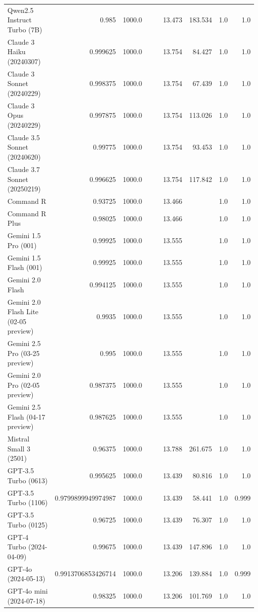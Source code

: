 \begin{table}[htp]
{\begin{tabular}{lrrrrrrrr}
Qwen2.5 Instruct Turbo (7B) & 0.985 & 1000.0 &  &  & 13.473 & 183.534 & 1.0 & 1.0 \\
Claude 3 Haiku (20240307) & 0.999625 & 1000.0 &  &  & 13.754 & 84.427 & 1.0 & 1.0 \\
Claude 3 Sonnet (20240229) & 0.998375 & 1000.0 &  &  & 13.754 & 67.439 & 1.0 & 1.0 \\
Claude 3 Opus (20240229) & 0.997875 & 1000.0 &  &  & 13.754 & 113.026 & 1.0 & 1.0 \\
Claude 3.5 Sonnet (20240620) & 0.99775 & 1000.0 &  &  & 13.754 & 93.453 & 1.0 & 1.0 \\
Claude 3.7 Sonnet (20250219) & 0.996625 & 1000.0 &  &  & 13.754 & 117.842 & 1.0 & 1.0 \\
Command R & 0.93725 & 1000.0 &  &  & 13.466 &  & 1.0 & 1.0 \\
Command R Plus & 0.98025 & 1000.0 &  &  & 13.466 &  & 1.0 & 1.0 \\
Gemini 1.5 Pro (001) & 0.99925 & 1000.0 &  &  & 13.555 &  & 1.0 & 1.0 \\
Gemini 1.5 Flash (001) & 0.99925 & 1000.0 &  &  & 13.555 &  & 1.0 & 1.0 \\
Gemini 2.0 Flash & 0.994125 & 1000.0 &  &  & 13.555 &  & 1.0 & 1.0 \\
Gemini 2.0 Flash Lite (02-05 preview) & 0.9935 & 1000.0 &  &  & 13.555 &  & 1.0 & 1.0 \\
Gemini 2.5 Pro (03-25 preview) & 0.995 & 1000.0 &  &  & 13.555 &  & 1.0 & 1.0 \\
Gemini 2.0 Pro (02-05 preview) & 0.987375 & 1000.0 &  &  & 13.555 &  & 1.0 & 1.0 \\
Gemini 2.5 Flash (04-17 preview) & 0.987625 & 1000.0 &  &  & 13.555 &  & 1.0 & 1.0 \\
Mistral Small 3 (2501) & 0.96375 & 1000.0 &  &  & 13.788 & 261.675 & 1.0 & 1.0 \\
GPT-3.5 Turbo (0613) & 0.995625 & 1000.0 &  &  & 13.439 & 80.816 & 1.0 & 1.0 \\
GPT-3.5 Turbo (1106) & 0.9799899949974987 & 1000.0 &  &  & 13.439 & 58.441 & 1.0 & 0.999 \\
GPT-3.5 Turbo (0125) & 0.96725 & 1000.0 &  &  & 13.439 & 76.307 & 1.0 & 1.0 \\
GPT-4 Turbo (2024-04-09) & 0.99675 & 1000.0 &  &  & 13.439 & 147.896 & 1.0 & 1.0 \\
GPT-4o (2024-05-13) & 0.9913706853426714 & 1000.0 &  &  & 13.206 & 139.884 & 1.0 & 0.999 \\
GPT-4o mini (2024-07-18) & 0.98325 & 1000.0 &  &  & 13.206 & 101.769 & 1.0 & 1.0 \\

\end{tabular}}
\end{table}
